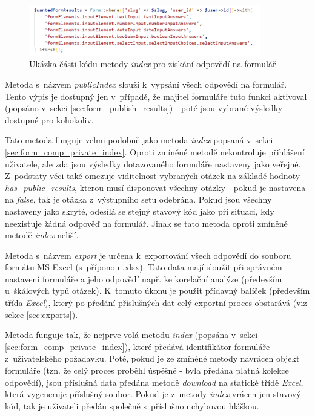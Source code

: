 			\begin{figure}[h]
				\centering
				\includegraphics[width=0.9\textwidth]{img/vraceni_vsech_vysledku.png}
				\caption{Ukázka části kódu metody \textit{index} pro získání odpovědí na formulář}
				\label{fig:vraceni_vsech_vysledku}
			\end{figure}
			
			\label{sec:form_comp_public_index}
			Metoda s~názvem \textit{publicIndex} slouží k~vypsání všech odpovědí na formulář. Tento výpis je dostupný jen v~případě, že majitel formuláře tuto funkci aktivoval (popsáno v~sekci \ref{sec:form_publish_results}) - poté jsou vybrané výsledky dostupné pro kohokoliv. 
			
			Tato metoda funguje velmi podobně jako metoda \textit{index} popsaná v~sekci \ref{sec:form_comp_private_index}. Oproti zmíněné metodě nekontroluje přihlášení uživatele, ale zda jsou výsledky dotazovaného formuláře nastaveny jako veřejné. Z~podstaty věci také omezuje viditelnost vybraných otázek na základě hodnoty \textit{has\_public\_results}, kterou musí disponovat všechny otázky - pokud je nastavena na \textit{false}, tak je otázka z~výstupního setu odebrána. Pokud jsou všechny nastaveny jako skryté, odesílá se stejný stavový kód jako při situaci, kdy neexistuje žádná odpověď na formulář. Jinak se tato metoda oproti zmíněné metodě \textit{index} neliší.
			
			\label{sec:form_comp_export}
			Metoda s~názvem \textit{export} je určena k~exportování všech odpovědí do souboru formátu MS Excel (s~příponou .xlsx). Tato data mají sloužit při správném nastavení formuláře a jeho odpovědí např. ke korelační analýze (především u~škálových typů otázek). K~tomuto úkonu je použit přídavný balíček  (především třída \textit{Excel}), který po předání příslušných dat celý exportní proces obstarává (viz sekce \ref{sec:exports}).
			
			Metoda funguje tak, že nejprve volá metodu \textit{index} (popsána v~sekci \ref{sec:form_comp_private_index}), které předává identifikátor formuláře z~uživatelského požadavku. Poté, pokud je ze zmíněné metody navrácen objekt formuláře (tzn. že celý proces proběhl úspěšně - byla předána platná kolekce odpovědí), jsou příslušná data předána metodě \textit{download} na statické třídě \textit{Excel}, která vygeneruje příslušný soubor. Pokud je z~metody \textit{index} vrácen jen stavový kód, tak je uživateli předán společně s~příslušnou chybovou hláškou.
			
